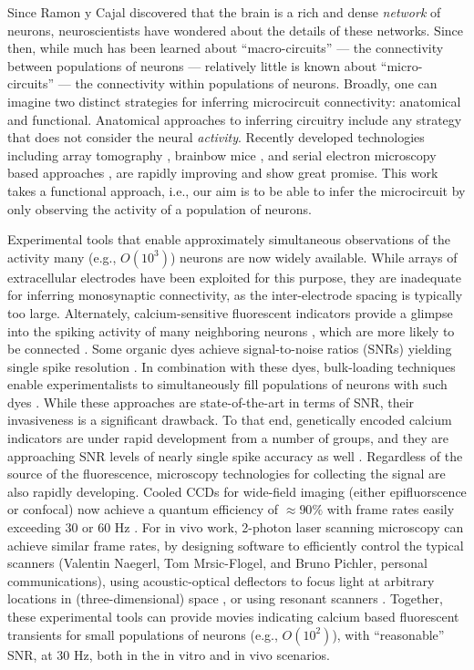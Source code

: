 Since Ramon y Cajal discovered that the brain is a rich and dense \emph{network} of neurons, neuroscientists have wondered about the details of these networks.  Since then, while much has been learned about ``macro-circuits''  --- the connectivity between populations of neurons --- relatively little is known about ``micro-circuits'' --- the connectivity within populations of neurons. Broadly, one can imagine two distinct strategies for inferring microcircuit connectivity: anatomical and functional.  Anatomical approaches to inferring circuitry include any strategy that does not consider the neural \emph{activity}.  Recently developed technologies including array tomography \cite{MichevaSmith07}, brainbow mice \cite{Brainbow07}, and serial electron microscopy based approaches \cite{Briggman2006}, are rapidly improving and show great promise.  This work takes a functional approach, i.e., our aim is to be able to infer the microcircuit by only observing the activity of a population of neurons.

Experimental tools that enable approximately simultaneous observations of the activity many (e.g., $O(10^3)$) neurons are now widely available.  While arrays of extracellular electrodes have been exploited for this purpose, they are inadequate for inferring monosynaptic connectivity, as the inter-electrode spacing is typically too large.  Alternately, calcium-sensitive fluorescent indicators provide a glimpse into the spiking activity of many neighboring neurons \cite{Tsien89}, which are more likely to be connected \cite{Abeles91, Braitenberg1998}. Some organic dyes achieve signal-to-noise ratios (SNRs) yielding single spike resolution \cite{ImagingManual}.  In combination with these dyes, bulk-loading techniques enable experimentalists to simultaneously fill populations of neurons with such dyes \cite{StosiekKonnerth03}.  While these approaches are state-of-the-art in terms of SNR, their invasiveness is a significant drawback.  To that end, genetically encoded calcium indicators are under rapid development from a number of groups, and they are approaching SNR levels of nearly single spike accuracy as well \cite{WallaceHasan08}. Regardless of the source of the fluorescence, microscopy technologies for collecting the signal are also rapidly developing.  Cooled CCDs for wide-field imaging (either epifluorscence or confocal) now achieve a quantum efficiency of $\approx 90 \%$ with frame rates easily exceeding $30$ or $60$ Hz \cite{Djurisic04}.  For in vivo work, 2-photon laser scanning microscopy can achieve similar frame rates, by designing software to efficiently control the typical scanners (Valentin Naegerl, Tom Mrsic-Flogel, and Bruno Pichler, personal communications), using acoustic-optical deflectors to focus light at arbitrary locations in (three-dimensional) space \cite{ReddySaggau05, Iyer06, SalomeBourdieu06, ReddySaggau08}, or using resonant scanners \cite{NguyenParker01}.  Together, these experimental tools can provide movies indicating calcium based fluorescent transients for small populations of neurons (e.g., $O(10^2)$), with ``reasonable'' SNR, at 30 Hz, both in the in vitro and in vivo scenarios.  

